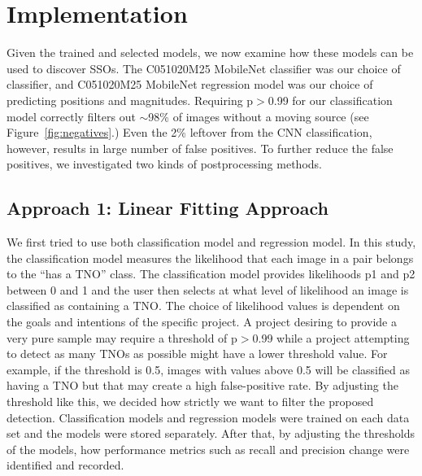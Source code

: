 
\section{Implementation}
\label{sect: Implementation}
Given the trained and selected models, we now examine how these models can be used to discover SSOs.
The C051020M25 MobileNet classifier was our choice of classifier, and C051020M25 MobileNet regression model was our choice of predicting positions and magnitudes.
Requiring p$>$0.99 for our classification model correctly filters out $\sim$98\% of images without a moving source (see Figure~\ref{fig:negatives}.)
Even the 2\% leftover from the CNN classification, however, results in large number of false positives.
To further reduce the false positives, we investigated two kinds of postprocessing methods.


\subsection{Approach 1: Linear Fitting Approach}
\label{Subsect: Linear Fitting Approach}
We first tried to use both classification model and regression model.
In this study, the classification model measures the likelihood that each image in a pair belongs to the ``has a TNO'' class.
The classification model provides likelihoods p1 and p2 between 0 and 1 and the user then selects at what level of likelihood an image is classified as containing a TNO. 
The choice of likelihood values is dependent on the goals and intentions of the specific project.
A project desiring to provide a very pure sample may require a threshold of p$>$0.99 while a project attempting to detect as many TNOs as possible might have a lower threshold value.
For example, if the threshold is 0.5, images with values above 0.5 will be classified as having a TNO but that may create a high false-positive rate. 
By adjusting the threshold like this, we decided how strictly we want to filter the proposed detection.
Classification models and regression models were trained on each data set and the models were stored separately.
After that, by adjusting the thresholds of the models, how performance metrics such as recall and precision change were identified and recorded.

